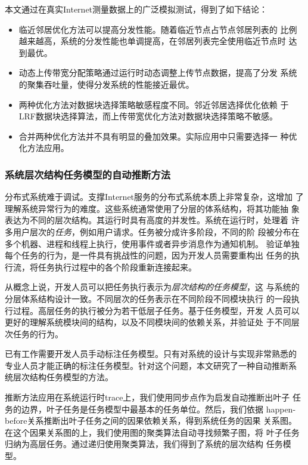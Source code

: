 本文通过在真实Internet测量数据上的广泛模拟测试，得到了如下结论：

\begin{itemize}

  \item 临近邻居优化方法可以提高分发性能。随着临近节点占节点邻居列表的
  比例越来越高，系统的分发性能也单调提高，在邻居列表完全使用临近节点时
  达到最优。

  \item 动态上传带宽分配策略通过运行时动态调整上传节点数据，提高了分发
  系统的聚集吞吐量，使得分发系统的性能接近最优。

  \item 两种优化方法对数据块选择策略敏感程度不同。邻近邻居选择优化依赖
  于LRF数据块选择算法，而上传带宽优化方法对数据块选择策略不敏感。

  \item 合并两种优化方法并不具有明显的叠加效果。实际应用中只需要选择一
  种优化方法应用。

\end{itemize}


\subsubsection*{系统层次结构任务模型的自动推断方法}

分布式系统难于调试。支撑Internet服务的分布式系统本质上非常复杂，这增加
了理解系统异常行为的难度。这些系统通常使用了分层的体系结构，将其功能抽
象表达为不同的层次结构。其运行时具有高度的并发性。系统在运行时，处理着
许多用户层次的\emph{任务}，例如用户请求。任务被分成许多阶段，不同的阶
段被分布在多个机器、进程和线程上执行，使用事件或者异步消息作为通知机制。
验证单独每个任务的行为，是一件具有挑战性的问题，因为开发人员需要重构出
任务的执行流，将任务执行过程中的各个阶段重新连接起来。

从概念上说，开发人员可以把任务执行表示为\emph{层次结构的任务模型}，这
与系统的分层体系结构设计一致。不同层次的任务表示在不同阶段不同模块执行
的一段执行过程。高层任务的执行被分为若干低层子任务。基于任务模型，开发
人员可以更好的理解系统模块间的结构，以及不同模块间的依赖关系，并验证处
于不同层次任务的行为。

已有工作需要开发人员手动标注任务模型。只有对系统的设计与实现非常熟悉的
专业人员才能正确的标注任务模型。针对这个问题，本文研究了一种自动推断系
统层次结构任务模型的方法。

推断方法应用在系统运行时trace上，我们使用同步点作为启发自动推断出叶子
任务的边界，叶子任务是任务模型中最基本的任务单位。然后，我们依据
happen-before关系推断出叶子任务之间的因果依赖关系，得到系统任务的因果
关系图。在这个因果关系图的上，我们使用图的聚类算法自动寻找频繁子图，将
叶子任务归纳为高层任务。通过递归使用聚类算法，我们得到了系统的层次结构
任务模型。

